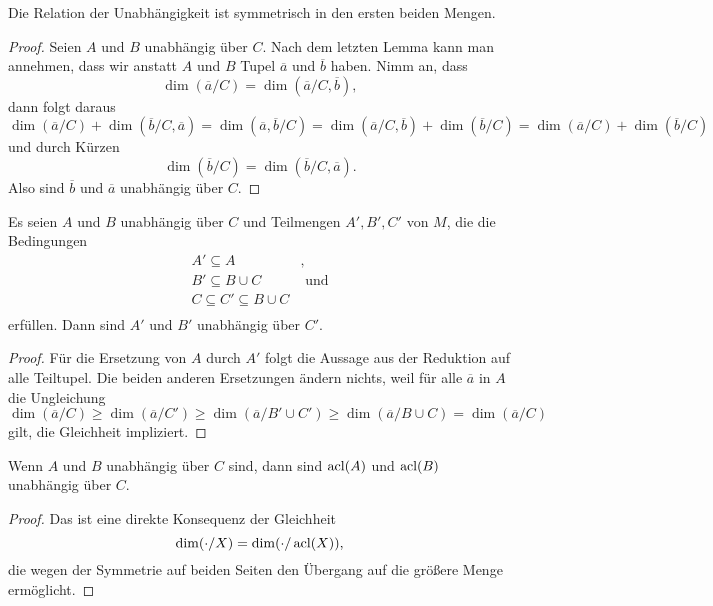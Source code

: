 \begin{lemma}
	Die Relation der Unabhängigkeit ist symmetrisch in den ersten beiden Mengen.
\end{lemma}
\begin{proof}
	Seien $A$ und $B$ unabhängig über $C$. Nach dem letzten Lemma kann man annehmen, dass wir anstatt $A$ und $B$ Tupel $\overline{a}$ und $\overline{b}$ haben. Nimm an, dass $$\dim(\overline{a}/C)=\dim(\overline{a}/C,\overline{b}),$$
	dann folgt daraus $$\dim(\overline{a}/C)+\dim(\overline{b}/C,\overline{a})=\dim(\overline{a},\overline{b}/C)=\dim(\overline{a}/C,\overline{b})+\dim(\overline{b}/C)=\dim(\overline{a}/C)+\dim(\overline{b}/C)$$ und durch Kürzen $$\dim(\overline{b}/C)=\dim(\overline{b}/C,\overline{a}).$$
	Also sind $\overline{b}$ und $\overline{a}$ unabhängig über $C$.
\end{proof}
\newpage
\begin{lemma}
	Es seien $A$ und $B$ unabhängig über $C$ und Teilmengen $A',B',C'$ von $M$, die die Bedingungen
	\begin{align*}
	A'\subseteq A&,\\B'\subseteq B\cup C&\text{ und}\\C\subseteq C'\subseteq B\cup C&\\
	\end{align*}
	erfüllen. Dann sind $A'$ und $B'$ unabhängig über $C'$.
\end{lemma}
\begin{proof}
	Für die Ersetzung von $A$ durch $A'$ folgt die Aussage aus der Reduktion auf alle Teiltupel. Die beiden anderen Ersetzungen ändern nichts, weil für alle $\overline{a}$ in $A$ die Ungleichung
	$$\dim(\overline{a}/C)\geq\dim(\overline{a}/C')\geq\dim(\overline{a}/B'\cup C')\geq\dim(\overline{a}/B\cup C)=\dim(\overline{a}/C)$$ gilt, die Gleichheit impliziert.
\end{proof}

\begin{lemma}\label{Unabhängigkeit acl}
	Wenn $A$ und $B$ unabhängig über $C$ sind, dann sind $\operatorname{acl}(A)$ und $\operatorname{acl}(B)$ unabhängig über $C$.
\end{lemma}
\begin{proof}
	Das ist eine direkte Konsequenz der Gleichheit $$\dim(\cdot/X)=\dim(\cdot/\operatorname{acl}(X)),$$ die wegen der Symmetrie auf beiden Seiten den Übergang auf die größere Menge ermöglicht.
\end{proof}


